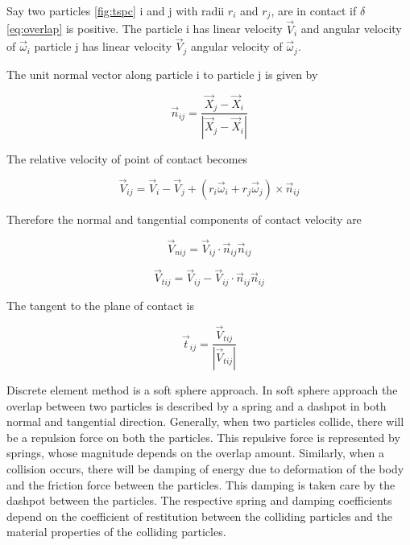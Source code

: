 Say two particles \eqref{fig:tspc} i and j with radii $r_{i}$ and
$r_{j}$, are in contact if $\delta$ \eqref{eq:overlap} is positive.
The particle i has linear velocity $\vec{V}_{i}$ and angular velocity
of $\vec{\omega}_{i}$ particle j has linear velocity $\vec{V}_{j}$ angular
velocity of $\vec{\omega}_{j}$.

The unit normal vector along particle i to particle j  is given by

\begin{equation}
  \label{eq:normal_unit}
  \vec{n}_{ij} = \frac{\vec{X}_{j} - \vec{X}_{i}}{|\vec{X}_{j} - \vec{X}_{i}|}
\end{equation}

The relative velocity of point of contact becomes

\begin{equation}
  \label{eq:relative}
  \vec{V}_{ij} = \vec{V}_{i} - \vec{V}_{j} +
  (r_{i} \vec{\omega}_{i} + r_{j} \vec{\omega}_{j}) \times \vec{n}_{ij}
\end{equation}

Therefore the normal and tangential components of contact velocity are

\begin{equation}
  \label{eq:normal_vel}
  \vec{V}_{nij} = \vec{V}_{ij} \cdot \vec{n}_{ij} \vec{n}_{ij}
\end{equation}

\begin{equation}
  \label{eq:tang_vel}
  \vec{V}_{tij} = \vec{V}_{ij} - \vec{V}_{ij} \cdot \vec{n}_{ij} \vec{n}_{ij}
\end{equation}

The tangent to the plane of contact is

\begin{equation}
  \label{eq:tang_unit}
  \vec{t}_{ij} = \frac{\vec{V}_{tij}}{|\vec{V}_{tij}|}
\end{equation}


Discrete element method is a soft sphere approach. In soft sphere
approach the overlap between two particles is described by a spring
and a dashpot in both normal and tangential direction. Generally, when
two particles collide, there will be a repulsion force on both the
particles. This repulsive force is represented by springs, whose
magnitude depends on the overlap amount. Similarly, when a collision
occurs, there will be damping of energy due to deformation of the body
and the friction force between the particles. This damping is taken
care by the dashpot between the particles. The respective spring and
damping coefficients depend on the coefficient of restitution between
the colliding particles and the material properties of the colliding
particles.


